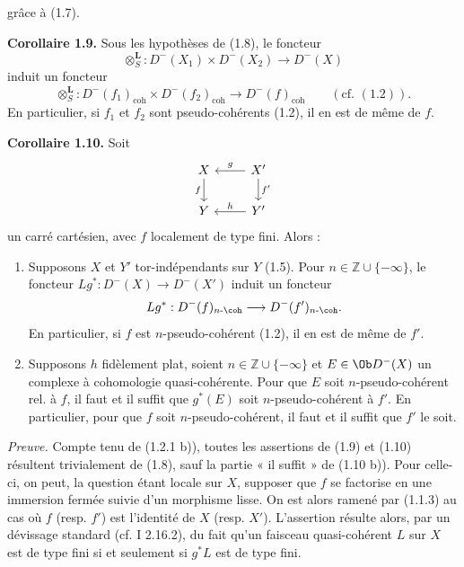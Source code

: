 grâce à (1.7).

\textbf{Corollaire 1.9.} Sous les hypothèses de (1.8), le foncteur
\[
  \otimes_S^{\mathbf L}:D^{-}(X_1)\times D^{-}(X_2)\longrightarrow D^{-}(X)
\]
induit un foncteur
\[
  \otimes_S^{\mathbf L}:D^{-}(f_1)_{\mathrm{coh}}\times D^{-}(f_2)_{\mathrm{coh}}
  \longrightarrow D^{-}(f)_{\mathrm{coh}}\qquad(\text{cf. }(1.2)).
\]
En particulier, si \(f_1\) et \(f_2\) sont pseudo-cohérents (1.2), il en est de même de \(f\).

\textbf{Corollaire 1.10.} Soit
\[
\begin{tikzcd}
X \arrow[d,"f"'] & X' \arrow[l,"g"'] \arrow[d,"f'"]\\
Y & Y' \arrow[l,"h"']
\end{tikzcd}
\]
un carré cartésien, avec \(f\) localement de type fini. Alors :
\begin{enumerate}[label=\alph*)]
\item Supposons \(X\) et \(Y'\) tor-indépendants sur \(Y\) (1.5). Pour \(n\in\mathbb Z\cup\{-\infty\}\), le foncteur \(Lg^*:D^{-}(X)\to D^{-}(X')\) induit un foncteur
\[
  Lg^*:D^{-}(f)_{n\text{-}\coh}\longrightarrow D^{-}(f')_{n\text{-}\coh}.
\]
En particulier, si \(f\) est \(n\)-pseudo-cohérent (1.2), il en est de même de \(f'\).

\item Supposons \(h\) fidèlement plat, soient \(n\in\mathbb Z\cup\{-\infty\}\) et \(E\in\Ob D^{-}(X)\) un complexe à cohomologie quasi-cohérente. Pour que \(E\) soit \(n\)-pseudo-cohérent rel. à \(f\), il faut et il suffit que \(g^*(E)\) soit \(n\)-pseudo-cohérent à \(f'\). En particulier, pour que \(f\) soit \(n\)-pseudo-cohérent, il faut et il suffit que \(f'\) le soit.
\end{enumerate}

\emph{Preuve.} Compte tenu de (1.2.1 b)), toutes les assertions de (1.9) et (1.10) résultent trivialement de (1.8), sauf la partie « il suffit » de (1.10 b)). Pour celle-ci, on peut, la question étant locale sur \(X\), supposer que \(f\) se factorise en une immersion fermée suivie d'un morphisme lisse. On est alors ramené par (1.1.3) au cas où \(f\) (resp. \(f'\)) est l'identité de \(X\) (resp. \(X'\)). L'assertion résulte alors, par un dévissage standard (cf. I 2.16.2), du fait qu'un faisceau quasi-cohérent \(L\) sur \(X\) est de type fini si et seulement si \(g^*L\) est de type fini.

